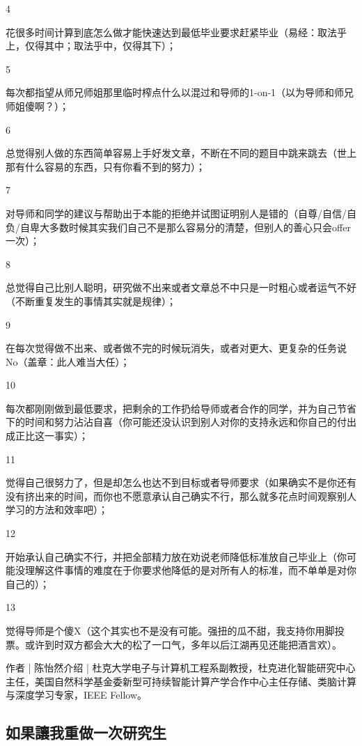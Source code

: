 4

花很多时间计算到底怎么做才能快速达到最低毕业要求赶紧毕业（易经：取法乎上，仅得其中；取法乎中，仅得其下）；

5

每次都指望从师兄师姐那里临时榨点什么以混过和导师的1-on-1（以为导师和师兄师姐傻啊？）；

6

总觉得别人做的东西简单容易上手好发文章，不断在不同的题目中跳来跳去（世上那有什么容易的东西，只有你看不到的努力）；

7

对导师和同学的建议与帮助出于本能的拒绝并试图证明别人是错的（自尊/自信/自负/自卑大多数时候其实我们自己不是那么容易分的清楚，但别人的善心只会offer一次）；

8

总觉得自己比别人聪明，研究做不出来或者文章总不中只是一时粗心或者运气不好（不断重复发生的事情其实就是规律）；

9

在每次觉得做不出来、或者做不完的时候玩消失，或者对更大、更复杂的任务说No（盖章：此人难当大任）；

10

每次都刚刚做到最低要求，把剩余的工作扔给导师或者合作的同学，并为自己节省下的时间和努力沾沾自喜（你可能还没认识到别人对你的支持永远和你自己的付出成正比这一事实）；

11

觉得自己很努力了，但是却怎么也达不到目标或者导师要求（如果确实不是你还有没有挤出来的时间，而你也不愿意承认自己确实不行，那么就多花点时间观察别人学习的方法和效率吧）；

12

开始承认自己确实不行，并把全部精力放在劝说老师降低标准放自己毕业上（你可能没理解这件事情的难度在于你要求他降低的是对所有人的标准，而不单单是对你自己的）；

13

觉得导师是个傻X（这个其实也不是没有可能。强扭的瓜不甜，我支持你用脚投票。或许到时双方都会大大的松了一口气，多年以后江湖再见还能把酒言欢）。

作者 | 陈怡然介绍 | 杜克大学电子与计算机工程系副教授，杜克进化智能研究中心主任，美国自然科学基金委新型可持续智能计算产学合作中心主任存储、类脑计算与深度学习专家，IEEE Fellow。



\subsection{ 如果讓我重做一次研究生}

